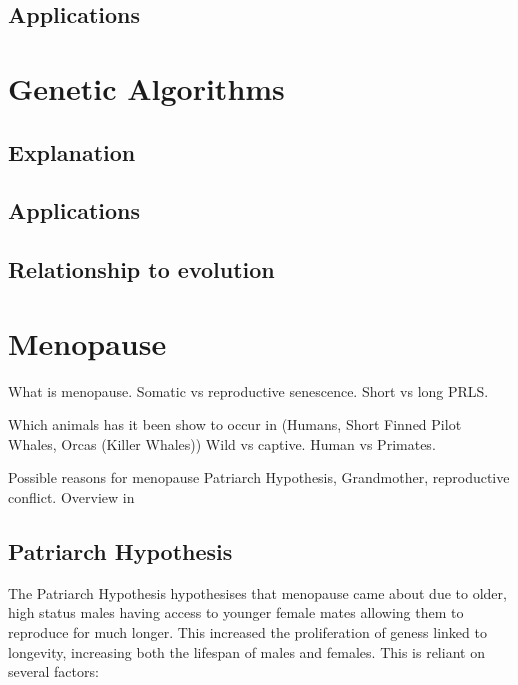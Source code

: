 \documentclass[authoryearcitations]{UoYCSproject}
\begin{document}
\subsection{Applications}

\section{Genetic Algorithms}

\subsection{Explanation}

\subsection{Applications}

\subsection{Relationship to evolution}

\newpage
\section{Menopause}
What is menopause. Somatic vs reproductive senescence. Short vs long PRLS.

Which animals has it been show to occur in (Humans, Short Finned Pilot Whales, Orcas (Killer Whales)) Wild vs captive. Human vs Primates.

Possible reasons for menopause Patriarch Hypothesis, Grandmother, reproductive conflict. Overview in \cite{evolutionPRLS2015}
\newpage
\subsection{Patriarch Hypothesis}
The Patriarch Hypothesis \cite{patriarchHypothesis2000} hypothesises that menopause came about due to older, high status males having access to younger female mates allowing them to reproduce for much longer. This increased the proliferation of geness linked to longevity, increasing both the lifespan of males and females. This is reliant on several factors: 
\end{document}
